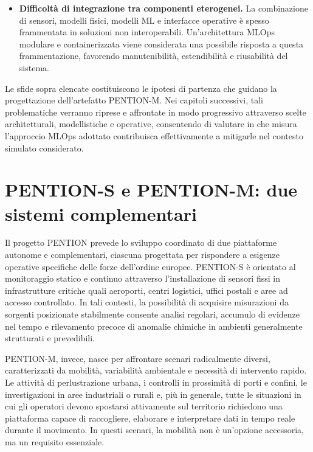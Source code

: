 \begin{itemize}
    \item \textbf{Difficoltà di integrazione tra componenti eterogenei.}
    La combinazione di sensori, modelli fisici, modelli ML e interfacce operative è spesso frammentata in soluzioni non interoperabili.
    Un’architettura MLOps modulare e containerizzata viene considerata una possibile risposta a questa frammentazione, favorendo manutenibilità, estendibilità e riusabilità del sistema.
\end{itemize}

Le sfide sopra elencate costituiscono le ipotesi di partenza che guidano la progettazione dell’artefatto \textsc{PENTION-M}.
Nei capitoli successivi, tali problematiche verranno riprese e affrontate in modo progressivo attraverso scelte architetturali, modellistiche e operative, consentendo di valutare in che misura l’approccio MLOps adottato contribuisca effettivamente a mitigarle nel contesto simulato considerato.

\section{PENTION-S e PENTION-M: due sistemi complementari}

Il progetto \textsc{PENTION} prevede lo sviluppo coordinato di due piattaforme autonome e complementari, ciascuna progettata per rispondere a esigenze operative specifiche delle forze dell’ordine europee.
\textsc{PENTION-S} è orientato al monitoraggio statico e continuo attraverso l’installazione di sensori fissi in infrastrutture critiche quali aeroporti, centri logistici, uffici postali e aree ad accesso controllato. In tali contesti, la possibilità di acquisire misurazioni da sorgenti posizionate stabilmente consente analisi regolari, accumulo di evidenze nel tempo e rilevamento precoce di anomalie chimiche in ambienti generalmente strutturati e prevedibili.

\textsc{PENTION-M}, invece, nasce per affrontare scenari radicalmente diversi, caratterizzati da mobilità, variabilità ambientale e necessità di intervento rapido.
Le attività di perlustrazione urbana, i controlli in prossimità di porti e confini, le investigazioni in aree industriali o rurali e, più in generale, tutte le situazioni in cui gli operatori devono spostarsi attivamente sul territorio richiedono una piattaforma capace di raccogliere, elaborare e interpretare dati in tempo reale durante il movimento. In questi scenari, la mobilità non è un'opzione accessoria, ma un requisito essenziale.

